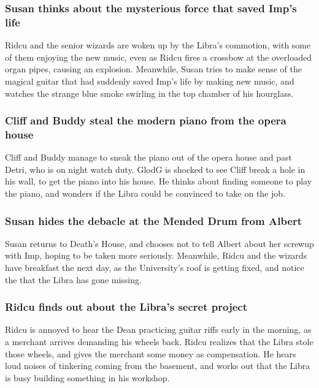 \subsubsection{\Gls{Susan} thinks about the mysterious force that saved \Gls{Imp}'s life}
\Gls{Ridcu} and the senior wizards are woken up by the \Gls{Libra}'s commotion, with some of them
enjoying the new music, even as \Gls{Ridcu} fires a crossbow at the overloaded organ pipes, causing
an explosion. Meanwhile, \Gls{Susan} tries to make sense of the magical guitar that had suddenly
saved \Gls{Imp}'s life by making new music, and watches the strange blue smoke swirling in the top
chamber of his hourglass.

\subsubsection{\Gls{Cliff} and \Gls{Buddy} steal the modern piano from the opera house}
\Gls{Cliff} and \Gls{Buddy} manage to sneak the piano out of the opera house and past \Gls{Detri},
who is on night watch duty. \Gls{GlodG} is shocked to see \Gls{Cliff} break a hole in his wall, to
get the piano into his house. He thinks about finding someone to play the piano, and wonders if
the \Gls{Libra} could be convinced to take on the job.

\subsubsection{\Gls{Susan} hides the debacle at the Mended Drum from \Gls{Albert}}
\Gls{Susan} returns to \Gls{Death}'s House, and chooses not to tell \Gls{Albert} about her screwup
with \Gls{Imp}, hoping to be taken more seriously. Meanwhile, \Gls{Ridcu} and the wizards have
breakfast the next day, as the University's roof is getting fixed, and notice the that the
\Gls{Libra} has gone missing.

\subsubsection{\Gls{Ridcu} finds out about the \Gls{Libra}'s secret project}
\Gls{Ridcu} is annoyed to hear the \Gls{Dean} practicing guitar riffs early in the morning, as
a merchant arrives demanding his wheels back. \Gls{Ridcu} realizes that the \Gls{Libra} stole those
wheels, and gives the merchant some money as compensation. He hears loud noises of tinkering coming
from the basement, and works out that the \Gls{Libra} is busy building something in his workshop.


